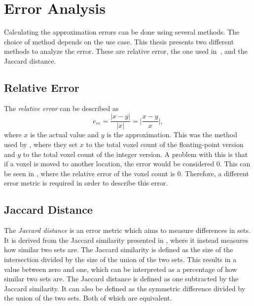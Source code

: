 \section{Error Analysis}\label{s:error}
Calculating the approximation errors can be done using several methods.
The choice of method depends on the use case.
This thesis presents two different methods to analyze the error.
These are relative error, the one used in~\cite{scanline-voxelization}, and the Jaccard distance.

\subsection{Relative Error}
The \textit{relative error} can be described as
\begin{equation*}
  e_{re} = \frac{|x - y|}{|x|} = \Big|\frac{x - y}{x}\Big|,
\end{equation*}
where $x$ is the actual value and $y$ is the approximation.
This was the method used by , where they set $x$ to the total voxel count of the floating-point version and $y$ to the total voxel count of the integer version.
A problem with this is that if a voxel is moved to another location, the error would be considered 0.
This can be seen in , where the relative error of the voxel count is 0.
Therefore, a different error metric is required in order to describe this error.



\newpage

\subsection{Jaccard Distance}\label{ss:mae}
The \textit{Jaccard distance} is an error metric which aims to measure differences in sets.
It is derived from  the Jaccard similarity presented in \cite{jaccard}, where it instead measures how similar two sets are.
The Jaccard similarity is defined as the size of the intersection divided by the size of the union of the two sets.
This results in a value between zero and one, which can be interpreted as a percentage of how similar two sets are.
The Jaccard distance is defined as one subtracted by the Jaccard similarity.
It can also be defined as the symmetric difference divided by the union of the two sets.
Both of which are equivalent.

